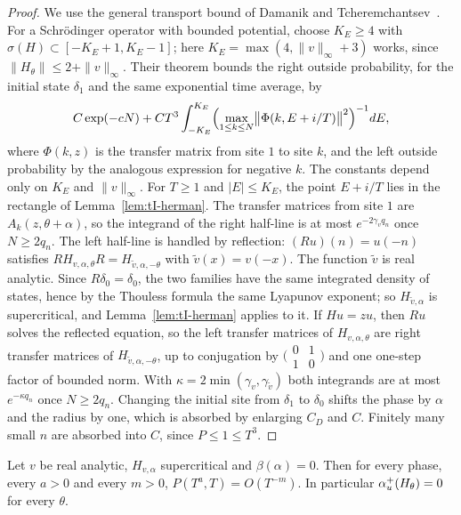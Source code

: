\begin{proof}
We use the general transport bound of Damanik and Tcheremchantsev~\cite[Theorem~7]{DT2007}. For a Schr\"odinger operator with bounded potential, choose $K_E\ge4$ with $\sigma(H)\subset[-K_E+1,K_E-1]$; here $K_E=\max(4,\|v\|_\infty+3)$ works, since $\|H_\theta\|\le2+\|v\|_\infty$. Their theorem bounds the right outside probability, for the initial state $\delta_1$ and the same exponential time average, by
\[
C\exp(-cN)+CT^3\int_{-K_E}^{K_E}\Bigl(\max_{1\le k\le N}\bigl\|\Phi(k,E+i/T)\bigr\|^2\Bigr)^{-1}dE,
\]
where $\Phi(k,z)$ is the transfer matrix from site $1$ to site $k$, and the left outside probability by the analogous expression for negative $k$. The constants depend only on $K_E$ and $\|v\|_\infty$. For $T\ge1$ and $|E|\le K_E$, the point $E+i/T$ lies in the rectangle of Lemma~\ref{lem:tI-herman}. The transfer matrices from site $1$ are $A_k(z,\theta+\alpha)$, so the integrand of the right half-line is at most $e^{-2\gamma_vq_n}$ once $N\ge2q_n$. The left half-line is handled by reflection: $(Ru)(n)=u(-n)$ satisfies $RH_{v,\alpha,\theta}R=H_{\tilde v,\alpha,-\theta}$ with $\tilde v(x)=v(-x)$. The function $\tilde v$ is real analytic. Since $R\delta_0=\delta_0$, the two families have the same integrated density of states, hence by the Thouless formula the same Lyapunov exponent; so $H_{\tilde v,\alpha}$ is supercritical, and Lemma~\ref{lem:tI-herman} applies to it. If $Hu=zu$, then $Ru$ solves the reflected equation, so the left transfer matrices of $H_{v,\alpha,\theta}$ are right transfer matrices of $H_{\tilde v,\alpha,-\theta}$, up to conjugation by $\bigl(\begin{smallmatrix}0&1\\1&0\end{smallmatrix}\bigr)$ and one one-step factor of bounded norm. With $\kappa=2\min(\gamma_v,\gamma_{\tilde v})$ both integrands are at most $e^{-\kappa q_n}$ once $N\ge2q_n$. Changing the initial site from $\delta_1$ to $\delta_0$ shifts the phase by $\alpha$ and the radius by one, which is absorbed by enlarging $C_D$ and $C$. Finitely many small $n$ are absorbed into $C$, since $P\le1\le T^3$.
\end{proof}

\begin{corollary}\label{cor:tI-beta0}
Let $v$ be real analytic, $H_{v,\alpha}$ supercritical and $\beta(\alpha)=0$. Then for every phase, every $a>0$ and every $m>0$, $P(T^a,T)=O(T^{-m})$. In particular $\alpha_u^+(H_\theta)=0$ for every $\theta$.
\end{corollary}

